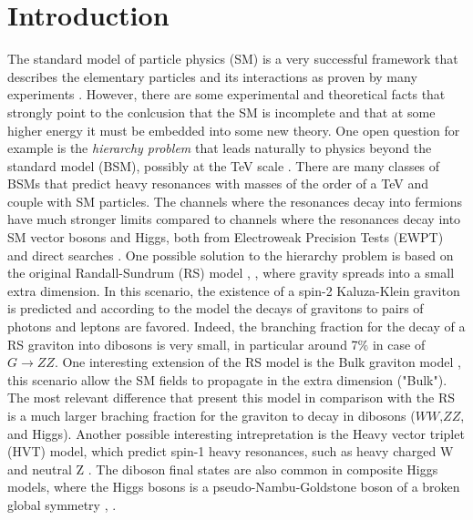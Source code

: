 \chapter{Introduction}

The standard model of particle physics (SM) \cite{Glashow:1961tr,PhysRevLett.19.1264,SM_Salam}
is a very successful framework
that describes the elementary particles and its interactions as proven by
many experiments \cite{Aad:2012tfa,HIGGS1,Benvenuti,Arnison1,Arnison2,Bagnaia1,Abe,Zboson1,Zboson2,acoplamento}.
However, there are some experimental and theoretical facts that strongly point to the conlcusion that the SM is incomplete and that at some higher energy it must be embedded into some new theory. One open question for example is the \emph{hierarchy problem} that leads naturally to physics beyond the standard model (BSM), possibly at the TeV scale \cite{ArkaniHamed:1998rs, PhysRevLett.49.970, Barbieri:1982eh, Agashe:2004rs, PhysRevD.75.055014, PhysRevLett.83.3370}.
There are many classes of BSMs that predict heavy
resonances with masses of the order of a TeV and couple with SM particles.
The channels where the resonances decay into fermions have
much stronger limits compared to channels where the resonances
decay into SM vector bosons and Higgs,
both from Electroweak Precision Tests (EWPT) and direct searches \cite{Hewett:2002fe}.
One possible solution to the hierarchy problem is based on the original Randall-Sundrum (RS) model \cite{Randall:1999ee}, \cite{Randall:1999vf},  where gravity spreads into a small extra dimension.
In this scenario, the existence of a spin-2 Kaluza-Klein graviton is predicted and according to the model
the decays of gravitons to pairs of photons and leptons are favored. Indeed, the branching fraction for the decay of a RS graviton into dibosons is very small, in particular around 7$\%$ in case of $G \rightarrow ZZ$.
One interesting extension of the RS model is the Bulk graviton model  \cite{Agashe:2007zd,Fitzpatrick:2007qr,Antipin:2007pi}, this scenario allow the SM fields to propagate in the extra dimension ("Bulk"). The most relevant difference that present this model in comparison with the RS is a much larger braching fraction for the graviton to decay in dibosons ($WW$,$ZZ$, and Higgs).
Another possible interesting intrepretation is the Heavy vector triplet (HVT) model, which predict spin-1 heavy resonances, such as heavy charged W and neutral Z \cite{Pappadopulo:2014qza}.
The diboson final states are also common in composite Higgs models, where the Higgs bosons is a pseudo-Nambu-Goldstone boson of a broken global symmetry \cite{Bellazzini:2014yua}, \cite{Contino:2011np}.

